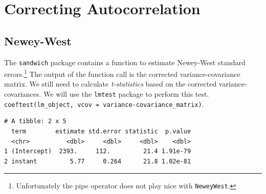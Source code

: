 \documentclass[]{book}
\newenvironment{Shaded}{\begin{snugshade}}{\end{snugshade}}
\newcommand{\CommentTok}[1]{\textcolor[rgb]{0.56,0.35,0.01}{\textit{#1}}}
\newcommand{\DataTypeTok}[1]{\textcolor[rgb]{0.13,0.29,0.53}{#1}}
\newcommand{\DecValTok}[1]{\textcolor[rgb]{0.00,0.00,0.81}{#1}}
\newcommand{\KeywordTok}[1]{\textcolor[rgb]{0.13,0.29,0.53}{\textbf{#1}}}
\newcommand{\NormalTok}[1]{#1}
\newcommand{\OperatorTok}[1]{\textcolor[rgb]{0.81,0.36,0.00}{\textbf{#1}}}
\newcommand{\StringTok}[1]{\textcolor[rgb]{0.31,0.60,0.02}{#1}}
\let\rmarkdownfootnote\footnote%
\def\footnote{\protect\rmarkdownfootnote}
\begin{document}
\hypertarget{correcting-autocorrelation}{%
\section{Correcting Autocorrelation}\label{correcting-autocorrelation}}

\hypertarget{newey-west}{%
\subsection{Newey-West}\label{newey-west}}

The \texttt{sandwich} package contains a function to estimate Newey-West standard errors.\footnote{Unfortunately the pipe operator does not play nice with \texttt{NeweyWest}.} The output of the function call is the corrected variance-covariance matrix. We still need to calculate \emph{t-statistics} based on the corrected variance-covariances. We will use the \texttt{lmtest} package to perform this test. \texttt{coeftest(lm\_object,\ vcov\ =\ variance-covariance\_matrix)}.

\begin{Shaded}
\end{Shaded}

\begin{verbatim}
# A tibble: 2 x 5
  term        estimate std.error statistic  p.value
  <chr>          <dbl>     <dbl>     <dbl>    <dbl>
1 (Intercept)  2393.     112.         21.4 1.91e-79
2 instant         5.77     0.264      21.8 1.02e-81
\end{verbatim}

\begin{Shaded}
\end{Shaded}
\end{document}
